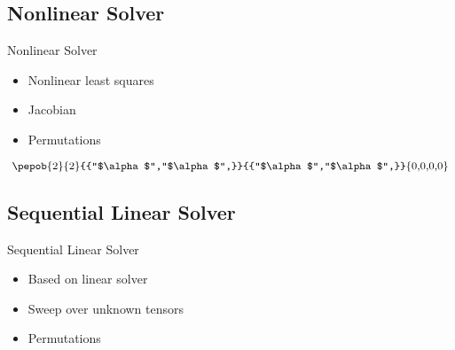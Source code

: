 \subsection{Nonlinear Solver}
\begin{frame}{Nonlinear Solver}

    \begin{minipage}{0.5\textwidth}
        \begin{itemize}
            \item Nonlinear least squares
            \item Jacobian
            \item Permutations
        \end{itemize}
    \end{minipage}
    \begin{minipage}{0.49\textwidth}
        \begin{equation}
            \vcenter{\hbox{   {\pepob{2}{2}{{"$\alpha$","$\alpha$",}}{{"$\alpha$","$\alpha$",}}{{0,0,0,0}}} }}
        \end{equation}
    \end{minipage}

\end{frame}

\subsection{Sequential Linear Solver}
\begin{frame}{Sequential Linear Solver}
    \begin{itemize}
        \item Based on linear solver
        \item Sweep over unknown tensors
        \item Permutations
    \end{itemize}
\end{frame}